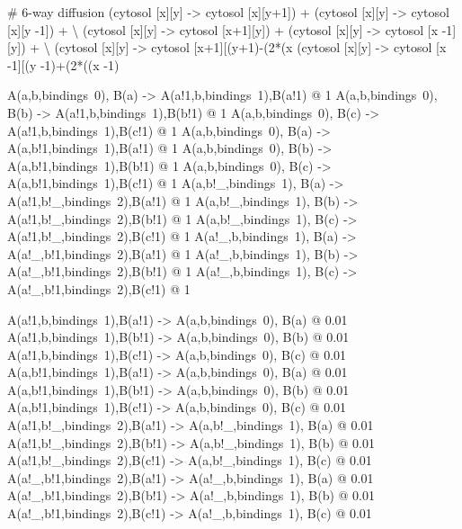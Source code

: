 \begin{kappasource}


# 6-way diffusion
    (cytosol [x][y] -> cytosol [x][y+1]) + (cytosol [x][y] -> cytosol [x][y -1]) + {\textbackslash}
    (cytosol [x][y] -> cytosol [x+1][y]) + (cytosol [x][y] -> cytosol [x -1][y]) + {\textbackslash}
    (cytosol [x][y] -> cytosol [x+1][(y+1)-(2*(x%
    (cytosol [x][y] -> cytosol [x -1][(y -1)+(2*((x -1)%


A(a,b,bindings~0), B(a) -> A(a!1,b,bindings~1),B(a!1) @ 1
A(a,b,bindings~0), B(b) -> A(a!1,b,bindings~1),B(b!1) @ 1
A(a,b,bindings~0), B(c) -> A(a!1,b,bindings~1),B(c!1) @ 1
A(a,b,bindings~0), B(a) -> A(a,b!1,bindings~1),B(a!1) @ 1
A(a,b,bindings~0), B(b) -> A(a,b!1,bindings~1),B(b!1) @ 1
A(a,b,bindings~0), B(c) -> A(a,b!1,bindings~1),B(c!1) @ 1
A(a,b!_,bindings~1), B(a) -> A(a!1,b!_,bindings~2),B(a!1) @ 1
A(a,b!_,bindings~1), B(b) -> A(a!1,b!_,bindings~2),B(b!1) @ 1
A(a,b!_,bindings~1), B(c) -> A(a!1,b!_,bindings~2),B(c!1) @ 1
A(a!_,b,bindings~1), B(a) -> A(a!_,b!1,bindings~2),B(a!1) @ 1
A(a!_,b,bindings~1), B(b) -> A(a!_,b!1,bindings~2),B(b!1) @ 1
A(a!_,b,bindings~1), B(c) -> A(a!_,b!1,bindings~2),B(c!1) @ 1

A(a!1,b,bindings~1),B(a!1) -> A(a,b,bindings~0), B(a) @ 0.01
A(a!1,b,bindings~1),B(b!1) -> A(a,b,bindings~0), B(b) @ 0.01
A(a!1,b,bindings~1),B(c!1) -> A(a,b,bindings~0), B(c) @ 0.01
A(a,b!1,bindings~1),B(a!1) -> A(a,b,bindings~0), B(a) @ 0.01
A(a,b!1,bindings~1),B(b!1) -> A(a,b,bindings~0), B(b) @ 0.01
A(a,b!1,bindings~1),B(c!1) -> A(a,b,bindings~0), B(c) @ 0.01
A(a!1,b!_,bindings~2),B(a!1) -> A(a,b!_,bindings~1), B(a) @ 0.01
A(a!1,b!_,bindings~2),B(b!1) -> A(a,b!_,bindings~1), B(b) @ 0.01
A(a!1,b!_,bindings~2),B(c!1) -> A(a,b!_,bindings~1), B(c) @ 0.01
A(a!_,b!1,bindings~2),B(a!1) -> A(a!_,b,bindings~1), B(a) @ 0.01
A(a!_,b!1,bindings~2),B(b!1) -> A(a!_,b,bindings~1), B(b) @ 0.01
A(a!_,b!1,bindings~2),B(c!1) -> A(a!_,b,bindings~1), B(c) @ 0.01


\end{kappasource}

